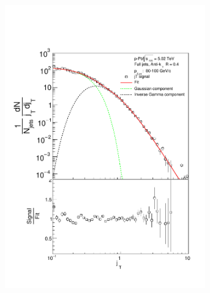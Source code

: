 \begin{figure}
\begin{subfigure}{0.24\textwidth}
\includegraphics[width=0.95\textwidth]{results/JetConejTSignalFit/JetConejTSignalFitNFin00JetPt06randomBgBayes}
\end{subfigure}
\begin{subfigure}{0.24\textwidth}

\end{subfigure}
\end{figure}

